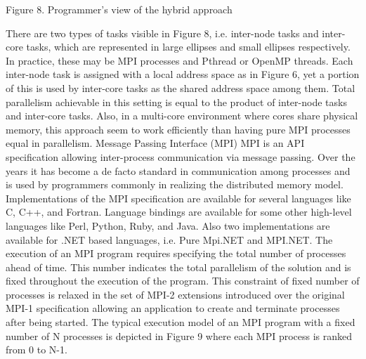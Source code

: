 Figure 8. Programmer's view of the hybrid approach

There are two types of tasks visible in Figure 8, i.e. inter-node tasks and inter-core tasks, which are represented in large ellipses and small ellipses respectively. In practice, these may be MPI processes and Pthread or OpenMP threads. Each inter-node task is assigned with a local address space as in Figure 6, yet a portion of this is used by inter-core tasks as the shared address space among them. Total parallelism achievable in this setting is equal to the product of inter-node tasks and inter-core tasks. Also, in a multi-core environment where cores share physical memory, this approach seem to work efficiently than having pure MPI processes equal in parallelism.
 Message Passing Interface (MPI)
MPI is an API specification allowing inter-process communication via message passing. Over the years it has become a de facto standard in communication among processes and is used by programmers commonly in realizing the distributed memory model. Implementations of the MPI specification are available for several languages like C, C++, and Fortran. Language bindings are available for some other high-level languages like Perl, Python, Ruby, and Java. Also two implementations are available for .NET based languages, i.e. Pure Mpi.NET and MPI.NET.
The execution of an MPI program requires specifying the total number of processes ahead of time. This number indicates the total parallelism of the solution and is fixed throughout the execution of the program. This constraint of fixed number of processes is relaxed in the set of MPI-2 extensions introduced over the original MPI-1 specification allowing an application to create and terminate processes after being started. 
The typical execution model of an MPI program with a fixed number of N processes is depicted in Figure 9 where each MPI process is ranked from 0 to N-1.
 
